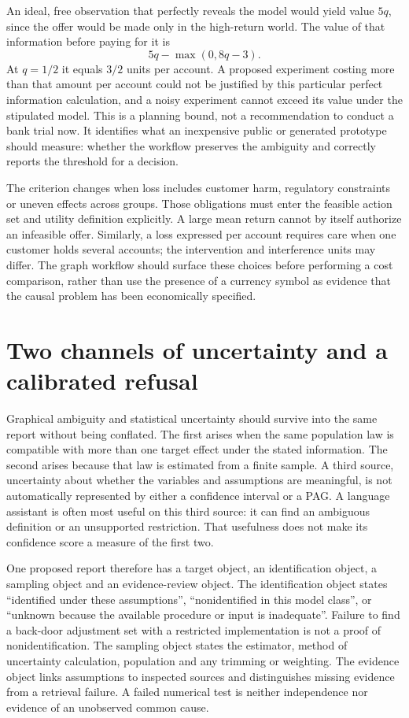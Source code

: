 An ideal, free observation that perfectly reveals the model would yield value
$5q$, since the offer would be made only in the high-return world. The value of
that information before paying for it is
\[
 5q-\max(0,8q-3).
\]
At $q=1/2$ it equals $3/2$ units per account. A proposed experiment costing more
than that amount per account could not be justified by this particular perfect
information calculation, and a noisy experiment cannot exceed its value under
the stipulated model. This is a planning bound, not a recommendation to conduct
a bank trial now. It identifies what an inexpensive public or generated
prototype should measure: whether the workflow preserves the ambiguity and
correctly reports the threshold for a decision.

The criterion changes when loss includes customer harm, regulatory constraints
or uneven effects across groups. Those obligations must enter the feasible
action set and utility definition explicitly. A large mean return cannot by
itself authorize an infeasible offer. Similarly, a loss expressed per account
requires care when one customer holds several accounts; the intervention and
interference units may differ. The graph workflow should surface these choices
before performing a cost comparison, rather than use the presence of a currency
symbol as evidence that the causal problem has been economically specified.

\section{Two channels of uncertainty and a calibrated refusal}

Graphical ambiguity and statistical uncertainty should survive into the same
report without being conflated. The first arises when the same population law
is compatible with more than one target effect under the stated information.
The second arises because that law is estimated from a finite sample. A third
source, uncertainty about whether the variables and assumptions are meaningful,
is not automatically represented by either a confidence interval or a PAG.
A language assistant is often most useful on this third source: it can find an
ambiguous definition or an unsupported restriction. That usefulness does not
make its confidence score a measure of the first two.

One proposed report therefore has a target object, an identification object,
a sampling object and an evidence-review object. The identification object
states ``identified under these assumptions'', ``nonidentified in this model
class'', or ``unknown because the available procedure or input is inadequate''.
Failure to find a back-door adjustment set with a restricted implementation is
not a proof of nonidentification. The sampling object states the estimator,
method of uncertainty calculation, population and any trimming or weighting.
The evidence object links assumptions to inspected sources and distinguishes
missing evidence from a retrieval failure. A failed numerical test is neither
independence nor evidence of an unobserved common cause.

